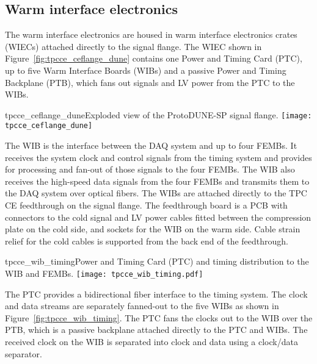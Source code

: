 \subsection{Warm interface electronics}
\label{subsec:warm_interface_elec}

The warm interface electronics are housed in warm interface electronics crates (WIECs)
attached directly to the signal flange.  The WIEC shown in Figure~\ref{fig:tpcce_ceflange_dune} 
contains one
Power and Timing Card (PTC), up to five Warm Interface Boards (WIBs) and a passive
Power and Timing Backplane (PTB), which fans out signals and LV power from the PTC to the WIBs.

\begin{cdrfigure}{tpcce_ceflange_dune}{Exploded view of the ProtoDUNE-SP signal flange.}
\texttt{[image: tpcce\_ceflange\_dune]}
\end{cdrfigure}

The WIB is the interface between the
DAQ system and up to four
FEMBs. It receives the system clock and control signals from the
timing system and provides for processing and fan-out of those signals to the four
FEMBs. The WIB also receives the high-speed data signals from the four 
FEMBs and transmits them to the DAQ system over optical
fibers.  The WIBs are attached directly to the TPC
CE feedthrough on the signal flange. The feedthrough
board is a PCB with connectors to the cold signal and LV power cables fitted
between the compression plate on the cold side, and sockets for
the WIB on the warm side. Cable strain relief for the cold cables is 
supported from the back end of the feedthrough.



\begin{cdrfigure}{tpcce_wib_timing}{Power and Timing Card (PTC) 
and timing distribution to the WIB and FEMBs.}
\texttt{[image: tpcce\_wib\_timing.pdf]}
\end{cdrfigure}

The PTC provides a bidirectional fiber interface to the
timing system.  The clock and data
streams are separately fanned-out to the five WIBs as shown in
Figure~\ref{fig:tpcce_wib_timing}. The PTC fans the clocks out to the WIB over the
PTB, which is a passive backplane attached directly to the PTC and
WIBs.  The received clock on the WIB is separated into clock and
data using a clock/data separator.

